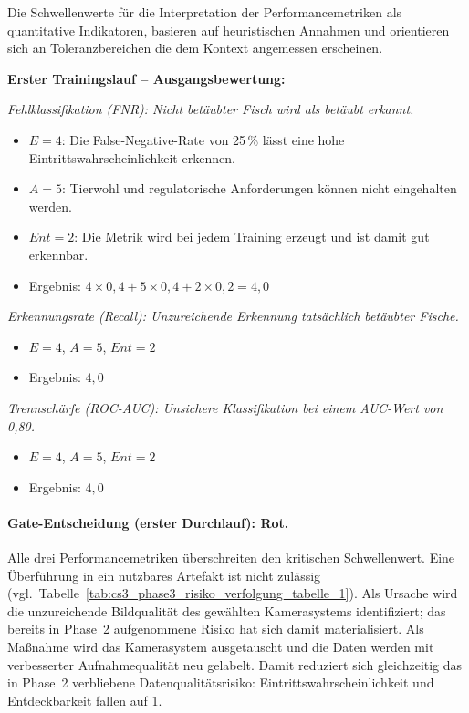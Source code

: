 Die Schwellenwerte für die Interpretation der Performancemetriken als quantitative Indikatoren,
basieren auf heuristischen Annahmen und orientieren sich an Toleranzbereichen die dem Kontext 
angemessen erscheinen.

\textbf{Erster Trainingslauf -- Ausgangsbewertung:}

\textit{Fehlklassifikation (FNR): Nicht betäubter Fisch wird als betäubt erkannt.}
\begin{itemize}
    \item $E = 4$: Die False-Negative-Rate von 25\,\% lässt eine hohe
    Eintrittswahrscheinlichkeit erkennen.
    \item $A = 5$: Tierwohl und regulatorische Anforderungen können nicht
    eingehalten werden.
    \item $Ent = 2$: Die Metrik wird bei jedem Training erzeugt und ist damit
    gut erkennbar.
    \item Ergebnis: $4 \times 0{,}4 + 5 \times 0{,}4 + 2 \times 0{,}2 = 4{,}0$
\end{itemize}

\textit{Erkennungsrate (Recall): Unzureichende Erkennung tatsächlich betäubter Fische.}
\begin{itemize}
    \item $E = 4$, $A = 5$, $Ent = 2$
    \item Ergebnis: $4{,}0$
\end{itemize}

\textit{Trennschärfe (ROC-AUC): Unsichere Klassifikation bei einem AUC-Wert von 0{,}80.}
\begin{itemize}
    \item $E = 4$, $A = 5$, $Ent = 2$
    \item Ergebnis: $4{,}0$
\end{itemize}

\paragraph{Gate-Entscheidung (erster Durchlauf): Rot.}
Alle drei Performancemetriken überschreiten den kritischen Schwellenwert.
Eine Überführung in ein nutzbares Artefakt ist nicht zulässig
(vgl.\ Tabelle~\ref{tab:cs3_phase3_risiko_verfolgung_tabelle_1}).
Als Ursache wird die unzureichende Bildqualität des gewählten Kamerasystems
identifiziert; das bereits in Phase~2 aufgenommene Risiko hat sich
damit materialisiert. Als Maßnahme wird das Kamerasystem ausgetauscht und
die Daten werden mit verbesserter Aufnahmequalität neu gelabelt. Damit
reduziert sich gleichzeitig das in Phase~2 verbliebene Datenqualitätsrisiko:
Eintrittswahrscheinlichkeit und Entdeckbarkeit fallen auf 1.


